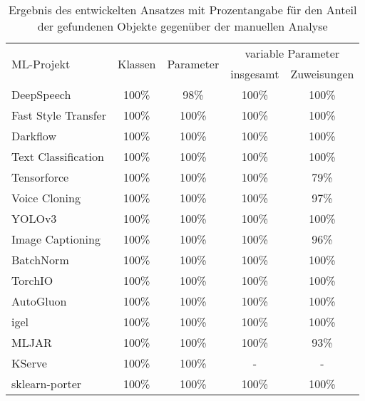 \documentclass[german,bachelor]{swsLeipzig}
\begin{document}
\begin{table}[H]
\small
\begin{center}
\setlength{\tabcolsep}{5pt}
\begin{tabular}[h]{l|c|c|c|c} %
\hline
\multirow{2}{*}{ML-Projekt} & \multirow{2}{*}{Klassen}   & \multirow{2}{*}{Parameter} &   \multicolumn{2}{c}{variable Parameter}\\
                            &           &           &   insgesamt   &   Zuweisungen \\
\hline \hline
DeepSpeech                          & 100\%                     & 98\%                         & 100\%             & 100\%\\
Fast Style Transfer                 & 100\%                     & 100\%                         & 100\%             & 100\%\\
Darkflow                            & 100\%                     & 100\%                         & 100\%              & 100\%\\
Text Classification                 & 100\%                     & 100\%                        & 100\%              & 100\%\\
Tensorforce                         & 100\%                    & 100\%                         & 100\%             & 79\%\\
\hline
Voice Cloning                      & 100\%                    & 100\%                        & 100\%            & 97\%\\
YOLOv3                              & 100\%                    & 100\%                        & 100\%             & 100\%\\
Image Captioning                    & 100\%                    & 100\%                        & 100\%             & 96\%\\
BatchNorm                           & 100\%                     & 100\%                        & 100\%              & 100\%\\
TorchIO                             & 100\%                     & 100\%                       & 100\%             & 100\%\\
\hline
AutoGluon                           & 100\%                     & 100\%                       & 100\%            & 100\%\\
igel                              & 100\%                      & 100\%                        & 100\%             & 100\%\\
MLJAR                              & 100\%                   & 100\%                         & 100\%             & 93\%\\
KServe                            & 100\%                     & 100\%                         & -                  & -\\
sklearn-porter                      & 100\%                   & 100\%                         & 100\%            & 100\%\\
\hline
\end{tabular}
\caption{Ergebnis des entwickelten Ansatzes mit Prozentangabe für den Anteil der gefundenen Objekte gegenüber der manuellen Analyse} \label{analyse}
\end{center}
\end{table}
\end{document}
